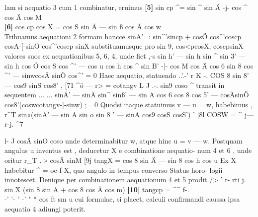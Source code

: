 \documentclass[12pt,a4paper]{article}
\begin{document}
lam  si  aequatio   3  cum   1   combinatur,  eruimus
\noindent \textbf{[5]} sin  cp  \^{}=  sin  \^{}  sin  Ä -j- cos  \^{}  cos  Ä  cos  M\\
\noindent \textbf{[6]} cos  cp  cos  X  =  cos  S  sin  Ä  ---  sin  ß  cos  Ä  cos  w\\
Tribuamus  aequationi  2  formam  hancce
sinA'=:  sin\^{}'sincp  +  cosÖ  cos\^{}'coscp  cosA-[-sinÖ  cos\^{}'coscp  sinX
substituamusque  pro   sin 9,  cos<pcosX,  coscpsinX   valores  suos  ex  aequationibus
5,  6,  4,    unde  fiet  ,-s
sin h' ---  sin h  sin \^{}  sin 3' ---  sin h  cos Ö  cos S  cos \^{}' ---  cos u  cos  h  cos \^{}  sin B'
-|- cos  M  cos  Ä  cos  6  sin  8  cos  \^{}' --- sinwcosÄ  sinÖ  cos\^{}'  =  0
Haec  aequatio,  statuendo  ..'.-'
r  K       -.  COS 8  sin 8' --- cos9  sinS  cos8'  ,
[71    \^{}ö --- r>  =  cotangv
L   J  .-.  sin9  coso  \^{}
transit  in  sequentem     ...  ...
sinÄ' --- sinÄ  sin\^{}  sinß' --- sin  A  cos 6  cos 8  cos 5'
---  cosÄsinÖ  cos8'(coswcotangv-[-sinw)  ;=  0
Quodsi  itaque  statuimus   v  ---  u  =  w,    habebimus
,  r\^{}T  sin«(sinA' --- sin A  sin o  sin 8 ' --- sinA  cos9  cosS  cosS')
'  |8l  COSW  =    \^{}
j---r-j.   \^{}7

l-   J  cosÄ  sinO  coso
unde  determinabitur  w,  atque  hinc    u  =  v  ---  w.
Postquam  angulus  u  inventus  est ,  deducetur   X   e  combinatione  aequatio-
num   4  et  6 ,  unde  oritur
r\_T  .  »  cosÄ  sinM
[9j  tangX  = cos  8  sin  Ä  ---  sin  8  cos  h  cos  u
Ex  X  habebitur    \^{}  =  oc-f-X,    quo  angulo  in  tempus  converso  Status  horo-
logii  innotescet.     Denique  per  combinationem  aequationum  4  et  5  prodit
         />  '
r- rti  j.  sin X  (sin 8  sin A  + cos 8  cos Ä  cos m)
\noindent \textbf{[10]} tangcp  =   \^{}\^{}  f-.\\
-'
'-  '    -'  "  *  cos  ft  sm  u
cui  formulae,  si  placet,  calculi  confirmandi  caussa  ipsa  aequatio  4  adiungi  poterit.

\newpage
\end{document}
